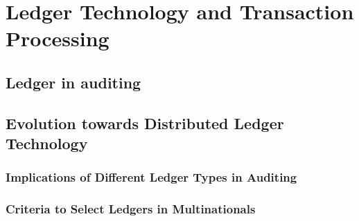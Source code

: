 \chapter{Ledger Technology and Transaction Processing}
\label{ch:ledger}

\section{Ledger in auditing}

\section{Evolution towards Distributed Ledger Technology}

\subsection{Implications of Different Ledger Types in Auditing}

\subsection{Criteria to Select Ledgers in Multinationals}